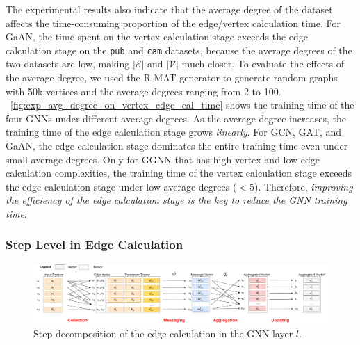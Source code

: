 The experimental results also indicate that the average degree of the dataset affects the time-consuming proportion of the edge/vertex calculation time.
For GaAN, the time spent on the vertex calculation stage exceeds the edge calculation stage on the \texttt{pub} and \texttt{cam} datasets, because the average degrees of the two datasets are low, making $|\mathcal{E}|$ and $|\mathcal{V}|$ much closer.
To evaluate the effects of the average degree, we used the R-MAT generator to generate random graphs with 50k vertices and the average degrees ranging from 2 to 100.
\figurename~\ref{fig:exp_avg_degree_on_vertex_edge_cal_time} shows the training time of the four GNNs under different average degrees.
As the average degree increases, the training time of the edge calculation stage grows \emph{linearly}.
For GCN, GAT, and GaAN, the edge calculation stage dominates the entire training time even under small average degrees.
Only for GGNN that has high vertex and low edge calculation complexities, the training time of the vertex calculation stage exceeds the edge calculation stage under low average degrees ($<5$).
Therefore, \emph{improving the efficiency of the edge calculation stage is the key to reduce the GNN training time}.

\subsubsection{Step Level in Edge Calculation}

\begin{figure}
    \centering
    \includegraphics[width=1\columnwidth]{figs/illustration/steps_in_edge_calculation.pdf}
    \caption{Step decomposition of the edge calculation in the GNN layer $l$.}
    \label{fig:steps_in_edge_calculation}
\end{figure}

